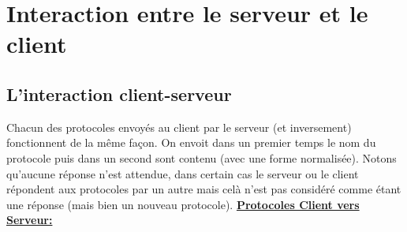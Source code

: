 \documentclass[a4paper,12pt]{report}
\begin{document}
  \chapter{Interaction entre le serveur et le client}

    \section{L'interaction client-serveur}
    Chacun des protocoles envoyés au client par le serveur (et inversement) fonctionnent de la même façon. On envoit dans un premier temps le nom du protocole puis dans un second sont contenu (avec une forme normalisée). Notons qu'aucune réponse n'est attendue, dans certain cas le serveur ou le client répondent aux protocoles par un autre mais celà n'est pas considéré comme étant une réponse (mais bien un nouveau protocole).
    \bigbreak
    \underline{\textbf{Protocoles Client vers Serveur:}}
    \medbreak
\end{document}
